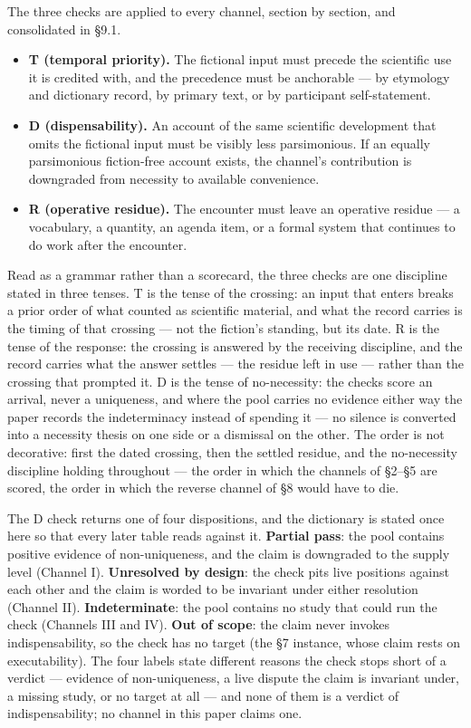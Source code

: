 \documentclass[11pt,a4paper]{article}
\begin{document}
The three checks are applied to every channel, section by section, and consolidated in §9.1.

\begin{itemize}[leftmargin=1.6em,itemsep=2pt,parsep=0pt,topsep=3pt]
\item \textbf{T (temporal priority).} The fictional input must precede the scientific use it is credited with, and the precedence must be anchorable — by etymology and dictionary record, by primary text, or by participant self-statement.
\item \textbf{D (dispensability).} An account of the same scientific development that omits the fictional input must be visibly less parsimonious. If an equally parsimonious fiction-free account exists, the channel's contribution is downgraded from necessity to available convenience.
\item \textbf{R (operative residue).} The encounter must leave an operative residue — a vocabulary, a quantity, an agenda item, or a formal system that continues to do work after the encounter.
\end{itemize}

Read as a grammar rather than a scorecard, the three checks are one discipline stated in three tenses. T is the tense of the crossing: an input that enters breaks a prior order of what counted as scientific material, and what the record carries is the timing of that crossing — not the fiction's standing, but its date. R is the tense of the response: the crossing is answered by the receiving discipline, and the record carries what the answer settles — the residue left in use — rather than the crossing that prompted it. D is the tense of no-necessity: the checks score an arrival, never a uniqueness, and where the pool carries no evidence either way the paper records the indeterminacy instead of spending it — no silence is converted into a necessity thesis on one side or a dismissal on the other. The order is not decorative: first the dated crossing, then the settled residue, and the no-necessity discipline holding throughout — the order in which the channels of §2–§5 are scored, the order in which the reverse channel of §8 would have to die.

The D check returns one of four dispositions, and the dictionary is stated once here so that every later table reads against it. \textbf{Partial pass}: the pool contains positive evidence of non-uniqueness, and the claim is downgraded to the supply level (Channel I). \textbf{Unresolved by design}: the check pits live positions against each other and the claim is worded to be invariant under either resolution (Channel II). \textbf{Indeterminate}: the pool contains no study that could run the check (Channels III and IV). \textbf{Out of scope}: the claim never invokes indispensability, so the check has no target (the §7 instance, whose claim rests on executability). The four labels state different reasons the check stops short of a verdict — evidence of non-uniqueness, a live dispute the claim is invariant under, a missing study, or no target at all — and none of them is a verdict of indispensability; no channel in this paper claims one.
\end{document}
